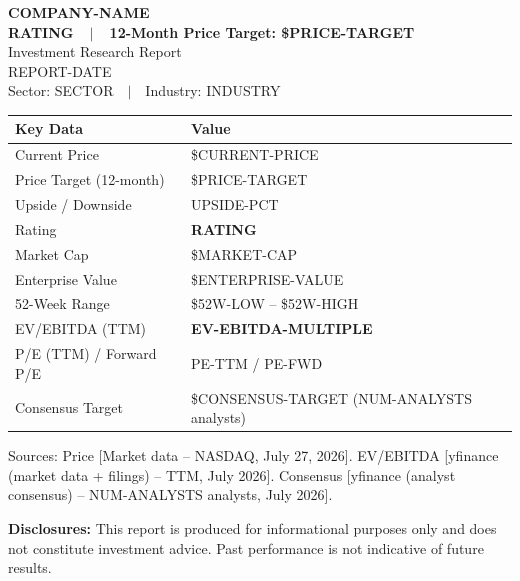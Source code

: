 \documentclass[11pt,a4paper]{report}
\begin{document}
\thispagestyle{empty}
\begin{center}
  \vspace*{2cm}
  {\Huge\bfseries\color{gsblue} COMPANY-NAME}\\[10pt]
  {\Large\bfseries RATING~~$\vert$~~12-Month Price Target: \$PRICE-TARGET}\\[20pt]
  {\large Investment Research Report}\\[6pt]
  {\normalsize\color{darkgray} REPORT-DATE}\\[4pt]
  {\normalsize\color{darkgray} Sector: SECTOR~~$\vert$~~Industry: INDUSTRY}\\[30pt]
  
  \hrulefill
  \vspace{15pt}
  
  \begin{tabularx}{\textwidth}{lX}
    \toprule
    \textbf{Key Data} & \textbf{Value} \\
    \midrule
    Current Price & \$CURRENT-PRICE \\
    Price Target (12-month) & \$PRICE-TARGET \\
    Upside / Downside & UPSIDE-PCT \\
    Rating & \textbf{RATING} \\
    Market Cap & \$MARKET-CAP \\
    Enterprise Value & \$ENTERPRISE-VALUE \\
    52-Week Range & \$52W-LOW -- \$52W-HIGH \\
     EV/EBITDA (TTM) & \textbf{EV-EBITDA-MULTIPLE} \\
    P/E (TTM) / Forward P/E & PE-TTM / PE-FWD \\
    Consensus Target & \$CONSENSUS-TARGET (NUM-ANALYSTS analysts) \\
    \bottomrule
  \end{tabularx}
  \vspace{5pt}
  {\footnotesize\color{darkgray} Sources: Price [Market data -- NASDAQ, July 27, 2026]. EV/EBITDA [yfinance (market data + filings) -- TTM, July 2026]. Consensus [yfinance (analyst consensus) -- NUM-ANALYSTS analysts, July 2026].}
  
  \vspace{20pt}
  \hrulefill
  \vspace{10pt}
  {\small\color{darkgray} \textbf{Disclosures:} This report is produced for informational purposes only and does not constitute investment advice. Past performance is not indicative of future results.}
\end{center}
\end{document}
